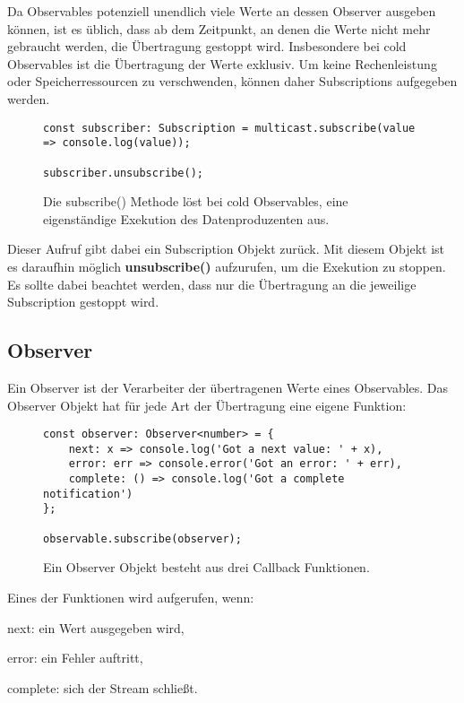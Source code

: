 Da Observables potenziell unendlich viele Werte an dessen Observer ausgeben können, ist es üblich, dass ab dem Zeitpunkt, an denen die Werte nicht mehr gebraucht werden, die Übertragung gestoppt wird. Insbesondere bei cold Observables ist die Übertragung der Werte exklusiv. Um keine Rechenleistung oder Speicherressourcen zu verschwenden, können daher Subscriptions aufgegeben werden.

\begin{figure}[H]
\begin{lstlisting}[basicstyle=\small]
const subscriber: Subscription = multicast.subscribe(value => console.log(value));

subscriber.unsubscribe();
\end{lstlisting}

\caption{Die subscribe() Methode löst bei cold Observables, eine eigenständige  Exekution des Datenproduzenten aus.}
\end{figure}

\noindent
Dieser Aufruf gibt dabei ein Subscription Objekt zurück. Mit diesem Objekt ist es daraufhin möglich \textbf{unsubscribe()} aufzurufen, um die Exekution zu stoppen. Es sollte dabei beachtet werden, dass nur die Übertragung an die jeweilige Subscription gestoppt wird.

\subsection{Observer}

Ein Observer ist der Verarbeiter der übertragenen Werte eines Observables. Das Observer Objekt hat für jede Art der Übertragung eine eigene Funktion:

\begin{figure}[H]
\begin{lstlisting}[basicstyle=\small]
const observer: Observer<number> = {
    next: x => console.log('Got a next value: ' + x),
    error: err => console.error('Got an error: ' + err),
    complete: () => console.log('Got a complete notification')
};

observable.subscribe(observer);
\end{lstlisting}
\caption{Ein Observer Objekt besteht aus drei Callback Funktionen.}
\end{figure}

\noindent
Eines der Funktionen wird aufgerufen, wenn:

\begin{description}
\item next: ein Wert ausgegeben wird,
\item error: ein Fehler auftritt,
\item complete: sich der Stream schließt.
\end{description}

